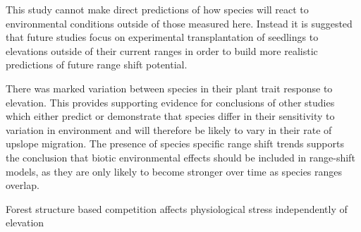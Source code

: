 \documentclass[a4paper, 11pt]{article}
\begin{document}
This study cannot make direct predictions of how species will react to environmental conditions outside of those measured here. Instead it is suggested that future studies focus on experimental transplantation of seedlings to elevations outside of their current ranges in order to build more realistic predictions of future range shift potential. 

There was marked variation between species in their plant trait response to elevation. This provides supporting evidence for conclusions of other studies which either predict or demonstrate that species differ in their sensitivity to variation in environment and will therefore be likely to vary in their rate of upslope migration. The presence of species specific range shift trends supports the conclusion that biotic environmental effects should be included in range-shift models, as they are only likely to become stronger over time as species ranges overlap.


Forest structure based competition affects physiological stress independently of elevation



\end{document}

